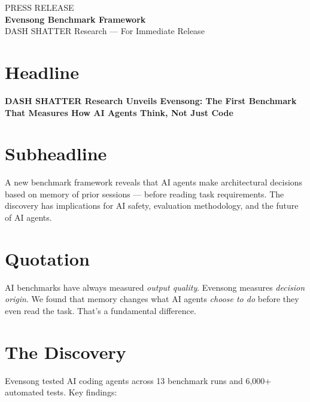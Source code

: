 \documentclass[11pt, a4paper]{article}
\begin{document}
\thispagestyle{fancy}

\begin{center}
{\fontsize{14pt}{18pt}\selectfont\sffamily\color{gray}PRESS RELEASE}\\[4pt]
{\fontsize{26pt}{32pt}\selectfont\sffamily\bfseries\color{deep}Evensong Benchmark Framework}\\[4pt]
{\fontsize{12pt}{16pt}\selectfont\sffamily\color{gray}DASH SHATTER Research — For Immediate Release}
\end{center}

\vspace{2mm}{\color{accent}\rule{\textwidth}{2pt}}

\section*{Headline}

\textbf{DASH SHATTER Research Unveils Evensong: The First Benchmark That Measures How AI Agents Think, Not Just Code}

\section*{Subheadline}

A new benchmark framework reveals that AI agents make architectural decisions based on memory of prior sessions — before reading task requirements. The discovery has implications for AI safety, evaluation methodology, and the future of AI agents.

\section*{Quotation}

\begin{pressquote}
AI benchmarks have always measured \emph{output quality}. Evensong measures \emph{decision origin}. We found that memory changes what AI agents \emph{choose to do} before they even read the task. That's a fundamental difference.
\end{pressquote}

\section*{The Discovery}

Evensong tested AI coding agents across 13 benchmark runs and 6,000+ automated tests. Key findings:
\end{document}
